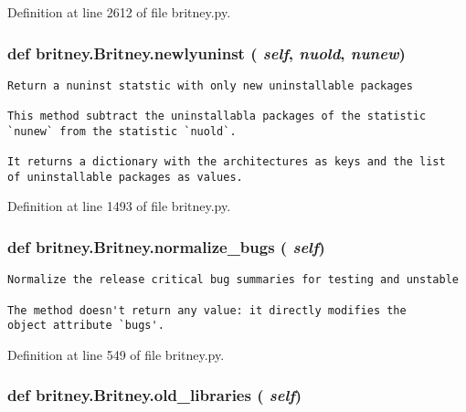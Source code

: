 Definition at line 2612 of file britney.py.
\subsubsection{\setlength{\rightskip}{0pt plus 5cm}def britney.Britney.newlyuninst ( {\em self},  {\em nuold},  {\em nunew})}\label{classbritney_1_1Britney_60ccd1851bcea5659fed15010541e244}




\footnotesize\begin{verbatim}Return a nuninst statstic with only new uninstallable packages

This method subtract the uninstallabla packages of the statistic
`nunew` from the statistic `nuold`.

It returns a dictionary with the architectures as keys and the list
of uninstallable packages as values.
\end{verbatim}
\normalsize
 

Definition at line 1493 of file britney.py.
\subsubsection{\setlength{\rightskip}{0pt plus 5cm}def britney.Britney.normalize\_\-bugs ( {\em self})}\label{classbritney_1_1Britney_5a6af4a100cfd54e872a27fa7f48ac3c}




\footnotesize\begin{verbatim}Normalize the release critical bug summaries for testing and unstable

The method doesn't return any value: it directly modifies the
object attribute `bugs'.
\end{verbatim}
\normalsize
 

Definition at line 549 of file britney.py.
\subsubsection{\setlength{\rightskip}{0pt plus 5cm}def britney.Britney.old\_\-libraries ( {\em self})}\label{classbritney_1_1Britney_39c07e55b274ff98cb9cecb5f051bc5d}




